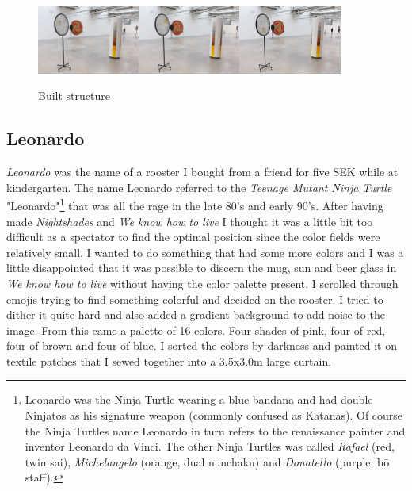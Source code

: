 \documentclass{article}
\begin{document}
\begin{figure}[ht!]
\centering
\includegraphics[width=0.3\textwidth]{images/results/we_know_how_to_live_2.jpg}\includegraphics[width=0.3\textwidth]{images/results/we_know_how_to_live_1.jpg}\includegraphics[width=0.3\textwidth]{images/results/we_know_how_to_live_3.jpg}
\caption{Built structure}
\end{figure}

\pagebreak

\subsection{Leonardo}

\emph{Leonardo} was the name of a rooster I bought from a friend for
five SEK while at kindergarten. The name Leonardo referred to the
\emph{Teenage Mutant Ninja Turtle} "Leonardo"\footnote{Leonardo was the
  Ninja Turtle wearing a blue bandana and had double Ninjatos as his
  signature weapon (commonly confused as Katanas). Of course the Ninja
  Turtles name Leonardo in turn refers to the renaissance painter and
  inventor Leonardo da Vinci. The other Ninja Turtles was called
  \emph{Rafael} (red, twin sai), \emph{Michelangelo} (orange, dual
  nunchaku) and \emph{Donatello} (purple, bō staff).} that was all the
rage in the late 80's and early 90's. After having made
\emph{Nightshades} and \emph{We know how to live} I thought it was a
little bit too difficult as a spectator to find the optimal position
since the color fields were relatively small. I wanted to do something
that had some more colors and I was a little disappointed that it was
possible to discern the mug, sun and beer glass in \emph{We know how to
live} without having the color palette present. I scrolled through
emojis trying to find something colorful and decided on the rooster. I
tried to dither it quite hard and also added a gradient background to
add noise to the image. From this came a palette of 16 colors. Four
shades of pink, four of red, four of brown and four of blue. I sorted
the colors by darkness and painted it on textile patches that I sewed
together into a 3.5x3.0m large curtain.
\end{document}
